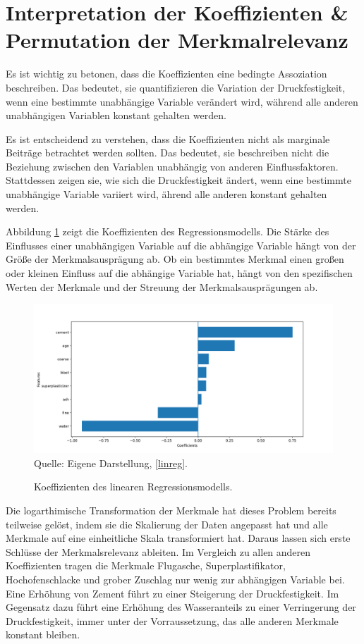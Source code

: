 \section{Interpretation der Koeffizienten \& Permutation der Merkmalrelevanz}

Es ist wichtig zu betonen, dass die Koeffizienten eine bedingte Assoziation beschreiben. 
Das bedeutet, sie quantifizieren die Variation der Druckfestigkeit, wenn eine bestimmte unabhängige Variable 
verändert wird, während alle anderen unabhängigen Variablen konstant gehalten werden.

Es ist entscheidend zu verstehen, dass die Koeffizienten nicht als marginale Beiträge betrachtet werden sollten. 
Das bedeutet, sie beschreiben nicht die Beziehung zwischen den Variablen unabhängig von anderen Einflussfaktoren. 
Stattdessen zeigen sie, wie sich die Druckfestigkeit ändert, wenn eine bestimmte unabhängige Variable variiert wird, 
ährend alle anderen konstant gehalten werden.

Abbildung \ref{pic:coef} zeigt die Koeffizienten des Regressionsmodells. Die Stärke des Einflusses einer 
unabhängigen Variable auf die abhängige Variable hängt von der Größe der Merkmalsausprägung ab. 
Ob ein bestimmtes Merkmal einen großen oder kleinen Einfluss auf die abhängige Variable hat, hängt
von den spezifischen Werten der Merkmale und der Streuung der Merkmalsausprägungen ab. 

\begin{figure}[!h]
    \caption{Koeffizienten des linearen Regressionsmodells.}
    \includegraphics[width=1\textwidth]{../scripts/images/coef.png}
    Quelle: Eigene Darstellung, \ref{linreg}.
    \label{pic:coef}
\end{figure}

Die logarthimische Transformation der Merkmale hat dieses Problem bereits 
teilweise gelöst, indem sie die Skalierung der Daten angepasst hat und alle Merkmale auf eine einheitliche Skala transformiert hat.
Daraus lassen sich erste Schlüsse der Merkmalsrelevanz ableiten. Im Vergleich zu allen anderen 
Koeffizienten tragen die Merkmale Flugasche, Superplastifikator, Hochofenschlacke und grober Zuschlag nur wenig zur abhängigen
Variable bei. Eine Erhöhung von Zement führt zu einer Steigerung der Druckfestigkeit. Im Gegensatz dazu führt eine Erhöhung des Wasseranteils 
zu einer Verringerung der Druckfestigkeit, immer unter der Vorraussetzung, das alle
anderen Merkmale konstant bleiben.

